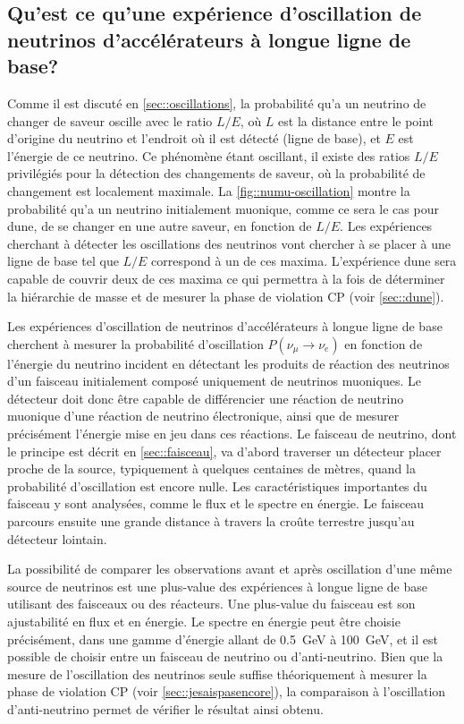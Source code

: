         \subsection{Qu'est ce qu'une expérience d'oscillation de neutrinos d'accélérateurs à longue ligne de base?}
            
            Comme il est discuté en \autoref{sec::oscillations}, la probabilité qu'a un neutrino de changer de saveur oscille avec le ratio $L/E$, où $L$ est la distance entre le point d'origine du neutrino et l'endroit où il est détecté (ligne de base), et $E$ est l'énergie de ce neutrino. Ce phénomène étant oscillant, il existe des ratios $L/E$ privilégiés pour la détection des changements de saveur, où la probabilité de changement est localement maximale. La \autoref{fig::numu-oscillation} montre la probabilité qu'a un neutrino initialement muonique, comme ce sera le cas pour \gls{dune}, de se changer en une autre saveur, en fonction de $L/E$. Les expériences cherchant à détecter les oscillations des neutrinos vont chercher à se placer à une ligne de base tel que $L/E$ correspond à un de ces maxima. L'expérience \gls{dune} sera capable de couvrir deux de ces maxima ce qui permettra à la fois de déterminer la hiérarchie de masse et de mesurer la phase de violation CP (voir \autoref{sec::dune}). 
            
            Les expériences d'oscillation de neutrinos d'accélérateurs à longue ligne de base cherchent à mesurer la probabilité d'oscillation $P(\nu_{\mu}\to \nu_e)$ en fonction de l'énergie du neutrino incident en détectant les produits de réaction des neutrinos d'un faisceau initialement composé uniquement de neutrinos muoniques. Le détecteur doit donc être capable de différencier une réaction de neutrino muonique d'une réaction de neutrino électronique, ainsi que de mesurer précisément l'énergie mise en jeu dans ces réactions. Le faisceau de neutrino, dont le principe est décrit en \autoref{sec::faisceau}, va d'abord traverser un détecteur placer proche de la source, typiquement à quelques centaines de mètres, quand la probabilité d'oscillation est encore nulle. Les caractéristiques importantes du faisceau y sont analysées, comme le flux et le spectre en énergie. Le faisceau parcours ensuite une grande distance à travers la croûte terrestre jusqu'au détecteur lointain. 
            
            La possibilité de comparer les observations avant et après oscillation d'une même source de neutrinos est une plus-value des expériences à longue ligne de base utilisant des faisceaux ou des réacteurs. Une plus-value du faisceau est son ajustabilité en flux et en énergie. Le spectre en énergie peut être choisie précisément, dans une gamme d'énergie allant de \SI{0.5}{\giga\electronvolt} à \SI{100}{\giga\electronvolt}, et il est possible de choisir entre un faisceau de neutrino ou d'anti-neutrino. Bien que la mesure de l'oscillation des neutrinos seule suffise théoriquement à mesurer la phase de violation CP (voir \autoref{sec::jesaispasencore}), la comparaison à l'oscillation d'anti-neutrino permet de vérifier le résultat ainsi obtenu.
            
